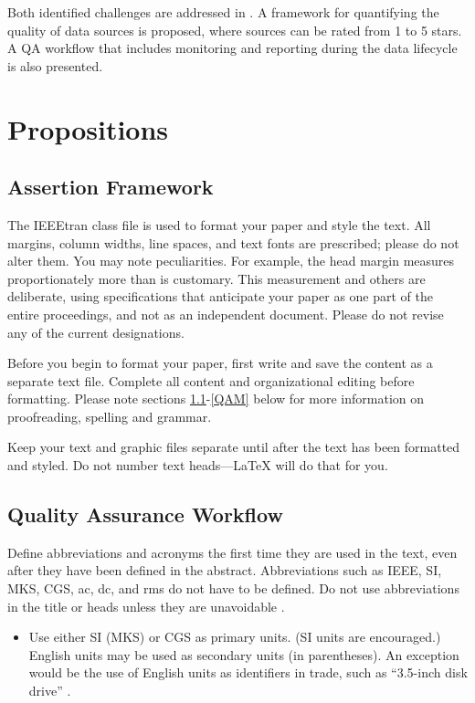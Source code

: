\documentclass[conference]{IEEEtran}
\begin{document}
Both identified challenges are addressed in \cite{wagner2022quality}. A framework for quantifying the quality of data sources is proposed, where sources can be rated from 1 to 5 stars. A QA workflow that includes monitoring and reporting during the data lifecycle is also presented.

\section{Propositions}

\subsection{Assertion Framework} \label{AF}

The IEEEtran class file is used to format your paper and style the text. All margins, 
column widths, line spaces, and text fonts are prescribed; please do not 
alter them. You may note peculiarities. For example, the head margin
measures proportionately more than is customary. This measurement 
and others are deliberate, using specifications that anticipate your paper 
as one part of the entire proceedings, and not as an independent document. 
Please do not revise any of the current designations.

Before you begin to format your paper, first write and save the content as a 
separate text file. Complete all content and organizational editing before 
formatting. Please note sections \ref{AF}-\ref{QAM} below for more information on 
proofreading, spelling and grammar.

Keep your text and graphic files separate until after the text has been 
formatted and styled. Do not number text heads---{\LaTeX} will do that 
for you.

\subsection{Quality Assurance Workflow}\label{QAW}
Define abbreviations and acronyms the first time they are used in the text, 
even after they have been defined in the abstract. Abbreviations such as 
IEEE, SI, MKS, CGS, ac, dc, and rms do not have to be defined. Do not use 
abbreviations in the title or heads unless they are unavoidable \cite{wagner2022quality}.

\begin{itemize}
\item Use either SI (MKS) or CGS as primary units. (SI units are encouraged.) English units may be used as secondary units (in parentheses). An exception would be the use of English units as identifiers in trade, such as ``3.5-inch disk drive'' \cite{sjr}.
\end{itemize}
\end{document}
